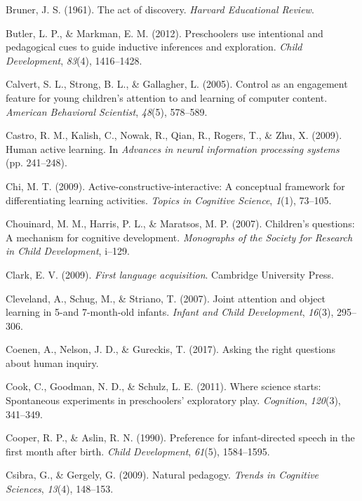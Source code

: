 \documentclass[a4paper,man,apacite,floatsintext]{apa6}
\begin{document}
\hypertarget{ref-bruner1961act}{}
Bruner, J. S. (1961). The act of discovery. \emph{Harvard Educational
Review}.

\hypertarget{ref-butler2012preschoolers}{}
Butler, L. P., \& Markman, E. M. (2012). Preschoolers use intentional
and pedagogical cues to guide inductive inferences and exploration.
\emph{Child Development}, \emph{83}(4), 1416--1428.

\hypertarget{ref-calvert2005control}{}
Calvert, S. L., Strong, B. L., \& Gallagher, L. (2005). Control as an
engagement feature for young children's attention to and learning of
computer content. \emph{American Behavioral Scientist}, \emph{48}(5),
578--589.

\hypertarget{ref-castro2009human}{}
Castro, R. M., Kalish, C., Nowak, R., Qian, R., Rogers, T., \& Zhu, X.
(2009). Human active learning. In \emph{Advances in neural information
processing systems} (pp. 241--248).

\hypertarget{ref-chi2009active}{}
Chi, M. T. (2009). Active-constructive-interactive: A conceptual
framework for differentiating learning activities. \emph{Topics in
Cognitive Science}, \emph{1}(1), 73--105.

\hypertarget{ref-chouinard2007children}{}
Chouinard, M. M., Harris, P. L., \& Maratsos, M. P. (2007). Children's
questions: A mechanism for cognitive development. \emph{Monographs of
the Society for Research in Child Development}, i--129.

\hypertarget{ref-clark2009first}{}
Clark, E. V. (2009). \emph{First language acquisition}. Cambridge
University Press.

\hypertarget{ref-cleveland2007joint}{}
Cleveland, A., Schug, M., \& Striano, T. (2007). Joint attention and
object learning in 5-and 7-month-old infants. \emph{Infant and Child
Development}, \emph{16}(3), 295--306.

\hypertarget{ref-coenen2017asking}{}
Coenen, A., Nelson, J. D., \& Gureckis, T. (2017). Asking the right
questions about human inquiry.

\hypertarget{ref-cook2011science}{}
Cook, C., Goodman, N. D., \& Schulz, L. E. (2011). Where science starts:
Spontaneous experiments in preschoolers' exploratory play.
\emph{Cognition}, \emph{120}(3), 341--349.

\hypertarget{ref-cooper1990preference}{}
Cooper, R. P., \& Aslin, R. N. (1990). Preference for infant-directed
speech in the first month after birth. \emph{Child Development},
\emph{61}(5), 1584--1595.

\hypertarget{ref-csibra2009natural}{}
Csibra, G., \& Gergely, G. (2009). Natural pedagogy. \emph{Trends in
Cognitive Sciences}, \emph{13}(4), 148--153.
\end{document}
